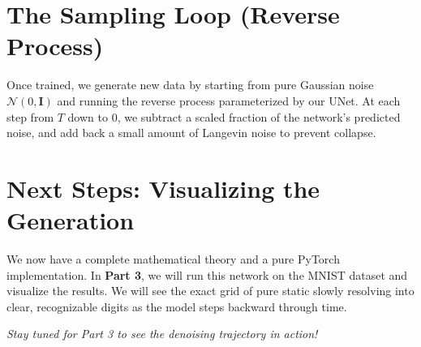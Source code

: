 \documentclass[12pt]{article}
\begin{document}
\section*{The Sampling Loop (Reverse Process)}
Once trained, we generate new data by starting from pure Gaussian noise $\mathcal{N}(0, \mathbf{I})$ and running the reverse process parameterized by our UNet. At each step from $T$ down to 0, we subtract a scaled fraction of the network's predicted noise, and add back a small amount of Langevin noise to prevent collapse.

\section*{Next Steps: Visualizing the Generation}
We now have a complete mathematical theory and a pure PyTorch implementation. In \textbf{Part 3}, we will run this network on the MNIST dataset and visualize the results. We will see the exact grid of pure static slowly resolving into clear, recognizable digits as the model steps backward through time.

\vspace{1em}
\noindent \textit{Stay tuned for Part 3 to see the denoising trajectory in action!}
\end{document}
